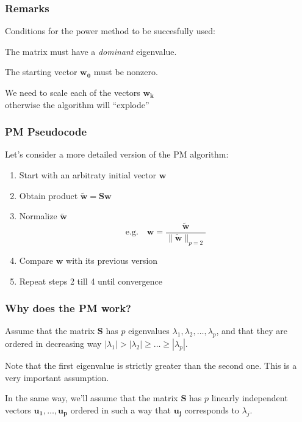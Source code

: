 \documentclass[12pt]{beamer}\usepackage[]{graphicx}\usepackage[]{color}
\begin{document}

\begin{frame}
\frametitle{Remarks}

Conditions for the power method to be succesfully used: 
\bbi
  \item The matrix must have a \textit{dominant} eigenvalue. 
  \item The starting vector $\mathbf{w_0}$ must be nonzero. 
  \item We need to scale each of the vectors $\mathbf{w_k}$ \\
  {\lolit otherwise the algorithm will ``explode''}
\ei

\end{frame}


\begin{frame}
\frametitle{PM Pseudocode}

Let's consider a more detailed version of the PM algorithm:
\begin{enumerate}
  \item Start with an arbitraty initial vector $\mathbf{w}$
  \item Obtain product $\mathbf{\tilde{w} = S w}$
  \item Normalize $\mathbf{\tilde{w}}$
  $$
  \text{e.g.} \quad \mathbf{w} = \frac{\mathbf{\tilde{w}}}{\| \mathbf{\tilde{w}} \|_{p=2}}
  $$
  \item Compare $\mathbf{w}$ with its previous version
  \item Repeat steps 2 till 4 until convergence
\end{enumerate}

\end{frame}


\begin{frame}
\frametitle{Why does the PM work?}

Assume that the matrix $\mathbf{S}$ has $p$ eigenvalues 
$\lambda_1, \lambda_2, \dots, \lambda_p$, and that they are ordered in 
decreasing way $|\lambda_1| > |\lambda_2| \geq \dots \geq |\lambda_p|$.

\bigskip
Note that the first eigenvalue is strictly greater than the second one. This is 
a very important assumption.

\bigskip
In the same way, we'll assume that the matrix $\mathbf{S}$ has $p$ linearly 
independent vectors $\mathbf{u_1}, \dots, \mathbf{u_p}$ ordered in such a way 
that $\mathbf{u_j}$ corresponds to $\lambda_j$. 

\end{frame}
\end{document}

